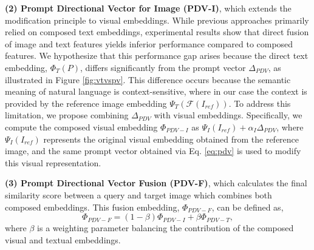 \textbf{(2) Prompt  Directional Vector for Image (PDV-I)}, which extends the modification principle to visual embeddings. While previous approaches primarily relied on composed text embeddings, experimental results show that direct fusion of image and text features yields inferior performance compared to composed features. We hypothesize that this performance gap arises because the direct text embedding, $\Phi_{T}(P)$, differs significantly from the prompt vector $\Delta_{PDV}$, as illustrated in Figure \ref{fig:vtvspv}. This difference occurs because the semantic meaning of natural language is context-sensitive, where in our case the context is provided by the reference image embedding $\Psi_T(\mathcal{F}(I_{ref}))$. To address this limitation, we propose combining $\Delta_{PDV}$ with visual embeddings. Specifically, we compute the composed visual embedding $\Phi_{PDV-I}$
as $\Psi_{I}(I_{ref}) + \alpha_I\Delta_{PDV}$, where $\Psi_{I}(I_{ref})$ represents the original visual embedding obtained from the reference image, and the same prompt vector obtained via Eq. \ref{eq:pdv} is used to modify this visual representation.

\textbf{(3) Prompt  Directional Vector Fusion (PDV-F)}, which calculates the final similarity score between a query and target image which combines both composed embeddings. This fusion embedding, $\Phi_{PDV-F}$, can be defined as,
\begin{equation}
	\Phi_{PDV-F} = (1-\beta)\Phi_{PDV-I} +\beta\Phi_{PDV-T},
\end{equation}
where $\beta$ is a weighting parameter balancing the contribution of the composed visual and textual embeddings.







